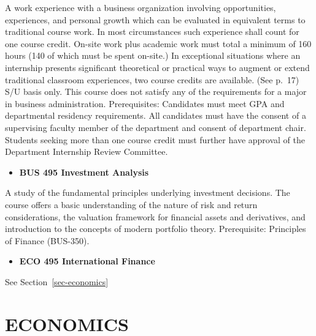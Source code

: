 \documentclass[
  letterpaper,
]{scrbook}
\providecommand{\tightlist}{%
  \setlength{\itemsep}{0pt}\setlength{\parskip}{0pt}}
\begin{document}
A work experience with a business organization involving opportunities,
experiences, and personal growth which can be evaluated in equivalent
terms to traditional course work. In most circumstances such experience
shall count for one course credit. On-site work plus academic work must
total a minimum of 160 hours (140 of which must be spent on-site.) In
exceptional situations where an internship presents significant
theoretical or practical ways to augment or extend traditional classroom
experiences, two course credits are available. (See p.~17) S/U basis
only. This course does not satisfy any of the requirements for a major
in business administration. Prerequisites: Candidates must meet GPA and
departmental residency requirements. All candidates must have the
consent of a supervising faculty member of the department and consent of
department chair. Students seeking more than one course credit must
further have approval of the Department Internship Review Committee.

\begin{itemize}
\tightlist
\item
  \textbf{BUS 495 Investment Analysis}
\end{itemize}

A study of the fundamental principles underlying investment decisions.
The course offers a basic understanding of the nature of risk and return
considerations, the valuation framework for financial assets and
derivatives, and introduction to the concepts of modern portfolio
theory. Prerequisite: Principles of Finance (BUS-350).

\begin{itemize}
\tightlist
\item
  \textbf{ECO 495 International Finance}
\end{itemize}

See Section~\ref{sec-economics}

\section{ECONOMICS}\label{economics}
\end{document}
